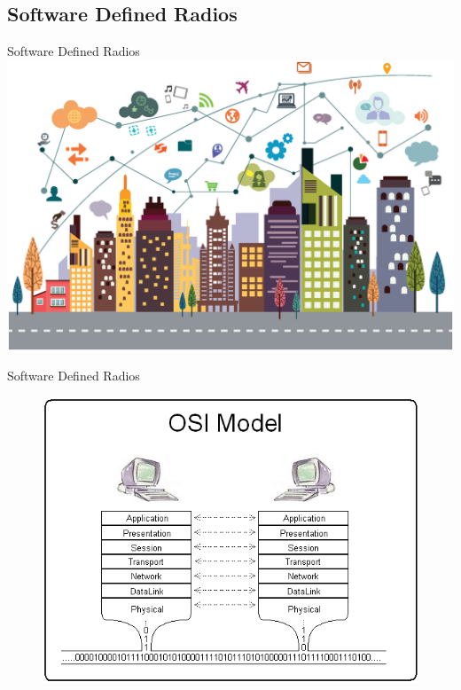 \documentclass{beamer}
\begin{document}
\subsection{Software Defined Radios}
\begin{frame}{Software Defined Radios}
	\includegraphics[width=\linewidth]{digital.eps}
\end{frame}
\begin{frame}{Software Defined Radios}
	\begin{figure}
 		\includegraphics[width=0.65\linewidth]{osi.jpg}
 		\label{fig:osi}
	\end{figure}
\end{frame}
\end{document}
